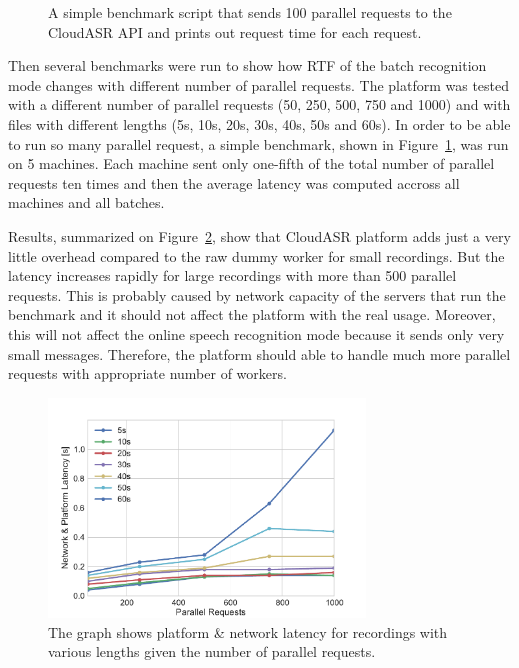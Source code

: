 \begin{figure}[h]
  

  \caption{A simple benchmark script that sends 100 parallel requests to the CloudASR API and prints out request time for each request.}
  \label{fig:benchmark}
\end{figure}

Then several benchmarks were run to show how RTF of the batch recognition mode changes with different number of parallel requests.
The platform was tested with a different number of parallel requests (50, 250, 500, 750 and 1000)
  and with files with different lengths (5s, 10s, 20s, 30s, 40s, 50s and 60s).
In order to be able to run so many parallel request,
  a simple benchmark, shown in Figure~\ref{fig:benchmark}, was run on 5 machines.
Each machine sent only one-fifth of the total number of parallel requests ten times
  and then the average latency was computed accross all machines and all batches.

Results, summarized on Figure~\ref{fig:parallel-benchmark}, show
  that CloudASR platform adds just a very little overhead compared to the raw dummy worker for small recordings.
But the latency increases rapidly for large recordings with more than 500 parallel requests.
This is probably caused by network capacity of the servers that run the benchmark
  and it should not affect the platform with the real usage.
Moreover, this will not affect the online speech recognition mode because it sends only very small messages.
Therefore, the platform should able to handle much more parallel requests with appropriate number of workers.

\begin{figure}
  \centering
  \includegraphics[width=0.75\textwidth]{./img/parallel.pdf}

  \caption{
    The graph shows platform \& network latency for recordings with various lengths
      given the number of parallel requests.
  }
  \label{fig:parallel-benchmark}
\end{figure}
